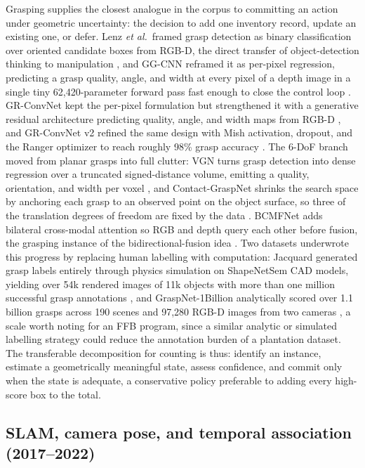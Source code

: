 Grasping supplies the closest analogue in the corpus to committing an action under geometric uncertainty: the decision to add one inventory record, update an existing one, or defer. Lenz \textit{et al.}\ framed grasp detection as binary classification over oriented candidate boxes from RGB-D, the direct transfer of object-detection thinking to manipulation \cite{lenz2015grasp}, and GG-CNN reframed it as per-pixel regression, predicting a grasp quality, angle, and width at every pixel of a depth image in a single tiny 62{,}420-parameter forward pass fast enough to close the control loop \cite{morrison2018ggcnn}. GR-ConvNet kept the per-pixel formulation but strengthened it with a generative residual architecture predicting quality, angle, and width maps from RGB-D \cite{kumra2020grconvnet}, and GR-ConvNet v2 refined the same design with Mish activation, dropout, and the Ranger optimizer to reach roughly 98\% grasp accuracy \cite{kumra2022grconvnetv2}. The 6-DoF branch moved from planar grasps into full clutter: VGN turns grasp detection into dense regression over a truncated signed-distance volume, emitting a quality, orientation, and width per voxel \cite{breyer2021vgn}, and Contact-GraspNet shrinks the search space by anchoring each grasp to an observed point on the object surface, so three of the translation degrees of freedom are fixed by the data \cite{sundermeyer2021contactgraspnet}. BCMFNet adds bilateral cross-modal attention so RGB and depth query each other before fusion, the grasping instance of the bidirectional-fusion idea \cite{zhang2023bcmfnet}. Two datasets underwrote this progress by replacing human labelling with computation: Jacquard generated grasp labels entirely through physics simulation on ShapeNetSem CAD models, yielding over 54k rendered images of 11k objects with more than one million successful grasp annotations \cite{depierre2018jacquard}, and GraspNet-1Billion analytically scored over 1.1 billion grasps across 190 scenes and 97{,}280 RGB-D images from two cameras \cite{fang2020graspnet}, a scale worth noting for an FFB program, since a similar analytic or simulated labelling strategy could reduce the annotation burden of a plantation dataset. The transferable decomposition for counting is thus: identify an instance, estimate a geometrically meaningful state, assess confidence, and commit only when the state is adequate, a conservative policy preferable to adding every high-score box to the total.



\subsection{SLAM, camera pose, and temporal association (2017--2022)}

